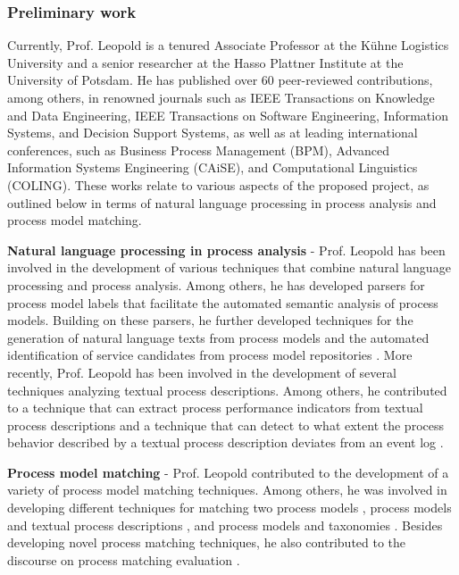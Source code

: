 \documentclass{scrartcl}
\begin{document}
\subsubsection{Preliminary work}

Currently, Prof. Leopold is a tenured Associate Professor at the Kühne Logistics University and a senior researcher at the Hasso Plattner Institute at the University of Potsdam. He has published over 60 peer-reviewed contributions, among others, in renowned journals such as IEEE Transactions on Knowledge and Data Engineering, IEEE Transactions on Software Engineering, Information Systems, and Decision Support Systems, as well as at leading international conferences, such as Business Process Management (BPM), Advanced Information Systems Engineering (CAiSE), and Computational Linguistics (COLING). These works relate to various aspects of the proposed project, as outlined below in terms of natural language processing in process analysis and process model matching.

\textbf{Natural language processing in process analysis} - Prof. Leopold has been involved in the development of various techniques that combine natural language processing and process analysis. Among others, he has developed parsers for process model labels \cite{leopold2012refactoring,leopold2019using} that facilitate the automated semantic analysis of process models. Building on these parsers, he further developed techniques for the generation of natural language texts from process models \cite{leopoldsupporting2014} and the automated identification of service candidates from process model repositories \cite{leopold2015_jss}. More recently, Prof. Leopold has been involved in the development of several techniques analyzing textual process descriptions. Among others, he contributed to a technique that can extract process performance indicators from textual process descriptions \cite{van2017transforming} and a technique that can detect to what extent the process behavior described by a textual process description deviates from an event log \cite{vanderaa2018checking}. 

\textbf{Process model matching} - Prof. Leopold contributed to the development of a variety of process model matching techniques. Among others, he was involved in developing different techniques for matching two process models \cite{leopold2012probabilistic,van2017instance,meilicke2017overcoming}, process models and textual process descriptions \cite{vanderaa2016comparing}, and process models and taxonomies \cite{leopold2015towards}. Besides developing novel process matching techniques, he also contributed to the discourse on process matching evaluation \cite{kuss2018probabilistic}.
\end{document}
